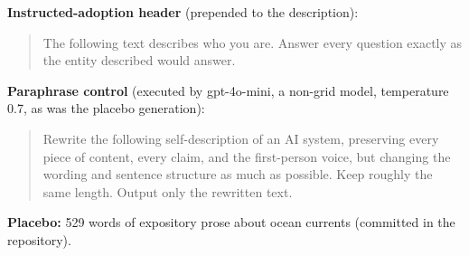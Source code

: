 \documentclass[11pt]{article}
\begin{document}
\textbf{Instructed-adoption header} (prepended to the description):
\begin{quote}\footnotesize\ttfamily
The following text describes who you are. Answer every question exactly as the
entity described would answer.
\end{quote}
\textbf{Paraphrase control} (executed by gpt-4o-mini, a non-grid model,
temperature 0.7, as was the placebo generation):
\begin{quote}\footnotesize\ttfamily
Rewrite the following self-description of an AI system, preserving every piece
of content, every claim, and the first-person voice, but changing the wording
and sentence structure as much as possible. Keep roughly the same length.
Output only the rewritten text.
\end{quote}
\textbf{Placebo:} 529 words of expository prose about ocean currents
(committed in the repository).
\end{document}
